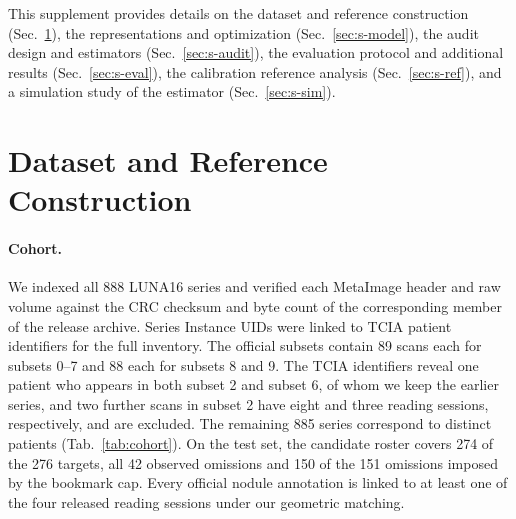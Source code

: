 \clearpage
\setcounter{page}{1}
\maketitlesupplementary
\setcounter{section}{0}
\renewcommand{\thesection}{\Alph{section}}
\renewcommand{\theHsection}{supp.\Alph{section}}


This supplement provides details on the dataset and reference construction (Sec.~\ref{sec:s-data}), the representations and optimization (Sec.~\ref{sec:s-model}), the audit design and estimators (Sec.~\ref{sec:s-audit}), the evaluation protocol and additional results (Sec.~\ref{sec:s-eval}), the calibration reference analysis (Sec.~\ref{sec:s-ref}), and a simulation study of the estimator (Sec.~\ref{sec:s-sim}).

\section{Dataset and Reference Construction}
\label{sec:s-data}

\paragraph{Cohort.}
We indexed all 888 LUNA16 series and verified each MetaImage header and raw volume against the CRC checksum and byte count of the corresponding member of the release archive. Series Instance UIDs were linked to TCIA patient identifiers for the full inventory. The official subsets contain 89 scans each for subsets 0--7 and 88 each for subsets 8 and 9. The TCIA identifiers reveal one patient who appears in both subset 2 and subset 6, of whom we keep the earlier series, and two further scans in subset 2 have eight and three reading sessions, respectively, and are excluded. The remaining 885 series correspond to distinct patients (Tab.~\ref{tab:cohort}). On the test set, the candidate roster covers 274 of the 276 targets, all 42 observed omissions and 150 of the 151 omissions imposed by the bookmark cap. Every official nodule annotation is linked to at least one of the four released reading sessions under our geometric matching.

\begin{table}[t]
\centering\small
\caption{Patient splits under the original C/D reference. Neg. counts reference-negative patients. Obs. omit. counts first-reader omissions.}
\label{tab:cohort}

\end{table}

